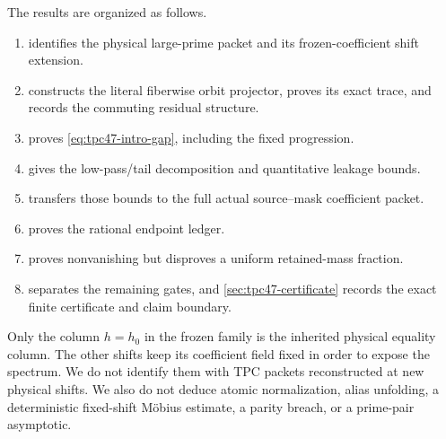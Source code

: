 The results are organized as follows.
\begin{enumerate}[leftmargin=2.2em]
 \item {} identifies the physical large-prime
       packet and its frozen-coefficient shift extension.
 \item {} constructs the literal fiberwise
       orbit projector, proves its exact trace, and records the
       commuting residual structure.
 \item {} proves
       \eqref{eq:tpc47-intro-gap}, including the fixed progression.
 \item {} gives the low-pass/tail
       decomposition and quantitative leakage bounds.
 \item {} transfers those bounds to the
       full actual source--mask coefficient packet.
 \item {} proves the rational endpoint ledger.
 \item {} proves nonvanishing but disproves
       a uniform retained-mass fraction.
 \item {} separates the remaining gates, and
       \cref{sec:tpc47-certificate} records the exact finite
       certificate and claim boundary.
\end{enumerate}

Only the column \(h=h_0\) in the frozen family is the inherited
physical equality column.  The other shifts keep its coefficient field
fixed in order to expose the spectrum.  We do not identify them with
TPC packets reconstructed at new physical shifts.  We also do not
deduce atomic normalization, alias unfolding, a deterministic
fixed-shift M\"obius estimate, a parity breach, or a prime-pair
asymptotic.
